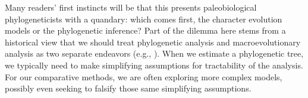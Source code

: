 \documentclass{article}
\begin{document}
Many readers’ first instincts will be that this presents paleobiological phylogeneticists with a quandary: which comes first, the character evolution models or the phylogenetic inference?  
Part of the dilemma here stems from a historical view that we should treat phylogenetic analysis and macroevolutionary analysis as two separate endeavors (e.g., \cite{Harvey1991}).  
When we estimate a phylogenetic tree, we typically need to make simplifying assumptions for tractability of the analysis.
For our comparative methods, we are often exploring more complex models, possibly even seeking to falsify those same simplifying assumptions.
\end{document}

